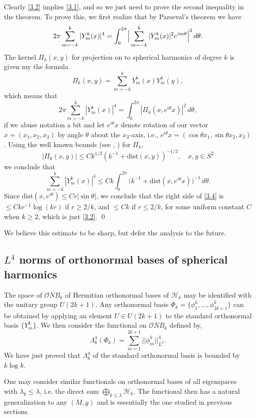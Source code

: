 \documentclass[10pt]{amsart}
\begin{document}
Clearly \eqref{3.2} implies \eqref{3.1}, and so we just need to prove the second inequality
in the theorem.  To prove this, we first realize that by Parseval's theorem we have
$$2\pi \sum_{m=-k}^k |Y^k_m(x)|^4 =\int_0^{2\pi} \Bigl| \, \sum_{m=-k}^k |Y^k_m(x)|^2
e^{im\theta}\Bigr|^2\, d\theta.$$
The kernel ${\varPi}_k(x,y)$ for projection on to spherical harmonics of degree $k$ is given
my the formula
$${\varPi}_k(x,y)=\sum_{m=-k}^k Y^k_m(x)\overline{Y^k_m(y)},$$
which means that
\begin{equation}\label{3.3}
2\pi \sum_{m=-k}^k |Y^k_m(x)|^4 =\int_0^{2\pi}
|{\varPi}_k(x,e^{i\theta}x)|^2 \, d\theta,
\end{equation}
if we abuse notation a bit and let $e^{i\theta}x$ denote rotation of our
vector $x=(x_1,x_2,x_3)$ by angle $\theta$ about the $x_3$-axis,
i.e., $e^{i\theta}x= (\cos\theta x_1,\sin\theta x_2,x_3)$.
Using the well known bounds (see \cite{szego}, \cite{sph}) for ${\varPi}_k$,
$$|{\varPi}_k(x,y)|\le Ck^{1/2}(k^{-1}+\text{dist}(x,y))^{-1/2}, \quad x,y\in S^2$$
we conclude that
\begin{equation}\label{3.4}\sum_{m=-k}^k|Y^k_m(x)|^4 \le Ck
\int_0^{2\pi} \bigl(k^{-1}+\text{dist}(x,e^{i\theta}x))^{-1} \, d\theta.
\end{equation}
Since $\text{dist}(x,e^{i\theta})\le Cr |\sin\theta|$, we conclude that the
right side of \eqref{3.4} is $\le Ckr^{-1}\log(kr)$ if $r\ge2/k$, and $\le Ck$
if $r\le 2/k$,
for some uniform constant $C$ when $k\ge2$, which is just \eqref{3.2}.  \qed

We believe this estimate to be sharp, but defer the analysis to
the future.

\subsection{\label{ONB} $L^4$ norms of orthonormal bases of spherical harmonics}

The space of  ${\mathcal ONB}_k$ of  Hermitian  orthonormal bases
of ${\mathcal H}_k$ may be identified with the unitary group $U(2k
+ 1)$. Any orthonormal basis $\Phi_k = \{\phi^k_1, \dots,
\phi^k_{2k + 1}\}$ can be obtained by applying an element $U \in
U(2k + 1)$ to the standard orthonormal basis $\{Y^k_m\}$. We then
consider the functional on ${\mathcal ONB}_k$ defined by,
$$\Lambda_k^4(\Phi_k) = \sum_{m =1}^{2k +1} ||\phi^k_{ m}||_{L^4}^4. $$
We have just proved that $\Lambda_k^4$ of the standard orthonormal
basis is bounded by $k \log k$.

One may consider similar functionals on orthonormal bases of all
eigenspaces with $\lambda_k \leq \lambda$, i.e. the direct sum
$\bigoplus_{k \leq \lambda} {\mathcal H}_{k}$. The functional then
has a natural generalization to any $(M, g)$ and is essentially
the one studied in previous sections.
\end{document}
